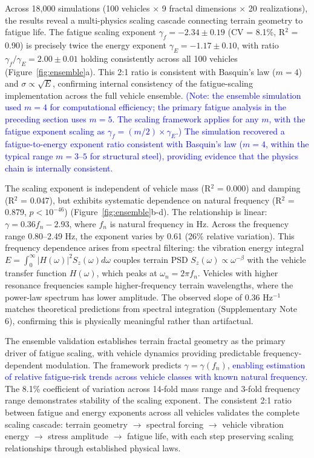 \documentclass[11pt]{article}
\begin{document}
Across 18,000 simulations (100 vehicles $\times$ 9 fractal dimensions $\times$ 20 realizations), the results reveal a multi-physics scaling cascade connecting terrain geometry to fatigue life. The fatigue scaling exponent $\gamma_f = -2.34 \pm 0.19$ (CV = 8.1\%, R$^2$ = 0.90) is precisely twice the energy exponent $\gamma_E = -1.17 \pm 0.10$, with ratio $\gamma_f / \gamma_E = 2.00 \pm 0.01$ holding consistently across all 100 vehicles (Figure~\ref{fig:ensemble}a). This 2:1 ratio is consistent with Basquin's law ($m = 4$) and $\sigma \propto \sqrt{E}$, confirming internal consistency of the fatigue-scaling implementation across the full vehicle ensemble. \textcolor{blue}{(Note: the ensemble simulation used $m = 4$ for computational efficiency; the primary fatigue analysis in the preceding section uses $m = 5$. The scaling framework applies for any $m$, with the fatigue exponent scaling as $\gamma_f = (m/2) \times \gamma_E$.)} \textcolor{blue}{The simulation recovered a fatigue-to-energy exponent ratio consistent with Basquin's law ($m = 4$, within the typical range $m = 3$--$5$ for structural steel), providing evidence that the physics chain is internally consistent.}

The scaling exponent is independent of vehicle mass (R$^2$ = 0.000) and damping (R$^2$ = 0.047), but exhibits systematic dependence on natural frequency (R$^2$ = 0.879, $p < 10^{-46}$) (Figure~\ref{fig:ensemble}b-d). The relationship is linear: $\gamma = 0.36 f_n - 2.93$, where $f_n$ is natural frequency in Hz. Across the frequency range 0.80--2.49 Hz, the exponent varies by 0.61 (26\% relative variation). This frequency dependence arises from spectral filtering: the vibration energy integral $E = \int_0^\infty |H(\omega)|^2 S_z(\omega) d\omega$ couples terrain PSD $S_z(\omega) \propto \omega^{-\beta}$ with the vehicle transfer function $H(\omega)$, which peaks at $\omega_n = 2\pi f_n$. Vehicles with higher resonance frequencies sample higher-frequency terrain wavelengths, where the power-law spectrum has lower amplitude. The observed slope of 0.36 Hz$^{-1}$ matches theoretical predictions from spectral integration (Supplementary Note 6), confirming this is physically meaningful rather than artifactual.

The ensemble validation establishes terrain fractal geometry as the primary driver of fatigue scaling, with vehicle dynamics providing predictable frequency-dependent modulation. The framework predicts $\gamma = \gamma(f_n)$, \textcolor{blue}{enabling estimation of relative fatigue-risk trends across vehicle classes with known natural frequency.} The 8.1\% coefficient of variation across 14-fold mass range and 3-fold frequency range demonstrates stability of the scaling exponent. The consistent 2:1 ratio between fatigue and energy exponents across all vehicles validates the complete scaling cascade: terrain geometry $\rightarrow$ spectral forcing $\rightarrow$ vehicle vibration energy $\rightarrow$ stress amplitude $\rightarrow$ fatigue life, with each step preserving scaling relationships through established physical laws.
\end{document}
